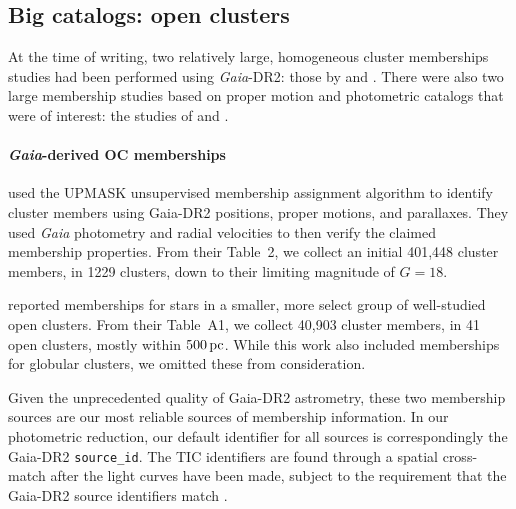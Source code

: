 \documentclass[12pt,twocolumn,tighten]{aastex62}
\begin{document}

\subsection{Big catalogs: open clusters}
\label{subsec:oc}

At the time of writing, two relatively large, homogeneous cluster
memberships studies had been performed using {\it Gaia}-DR2: those by
\citet{cantat-gaudin_gaia_2018} and \citet{gaia_hr_2018}.
There were also two large membership studies based on proper motion and 
photometric catalogs that were of interest: the studies of
\citet{Kharchenko_et_al_2013} and \citet{dias_proper_2014}.

\paragraph{{\it Gaia}-derived OC memberships}

\citet{cantat-gaudin_gaia_2018} used the UPMASK unsupervised membership
assignment algorithm \citep{krone-martins_upmask_2014} to identify cluster
members using Gaia-DR2 positions, proper motions, and parallaxes.
They used {\it Gaia} photometry and radial velocities to then verify the
claimed membership properties.  From their Table~2, we collect an initial
401{,}448 cluster members, in 1229 clusters, down to their limiting magnitude
of $G=18$.

\citet{gaia_hr_2018} reported memberships for stars in a smaller, more
select group of well-studied open clusters. From their Table~A1, we
collect 40{,}903 cluster members, in 41 open clusters, mostly within
$500\,{\rm pc}$. While this work also included memberships for
globular clusters, we omitted these from consideration.

Given the unprecedented quality of Gaia-DR2 astrometry, these two
membership sources are our most reliable sources of membership
information.  In our photometric reduction,  our default identifier
for all sources is correspondingly the Gaia-DR2 \texttt{source\_id}.
The TIC identifiers are found through a spatial cross-match after the
light curves have been made, subject to the requirement that the
Gaia-DR2 source identifiers match
\citep{stassun_TIC_2018,stassun_TIC8_2019}.  

\end{document}
